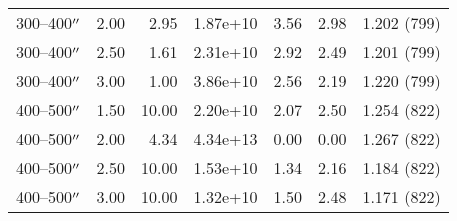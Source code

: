\documentclass[preprint2,tighten,trackchanges]{aastex6}
\begin{document}
\begin{table*}
\begin{tabular}{@{}lrrrrrr@{}}
        300--400$\mbox{$^{\prime\prime}$}$ & 2.00 & 2.95 & 1.87e+10 & 3.56 & 2.98 & 1.202 (799) \\  %
        300--400$\mbox{$^{\prime\prime}$}$ & 2.50 & 1.61 & 2.31e+10 & 2.92 & 2.49 & 1.201 (799) \\  %
        300--400$\mbox{$^{\prime\prime}$}$ & 3.00 & 1.00 & 3.86e+10 & 2.56 & 2.19 & 1.220 (799) \\  %
        \midrule
        400--500$\mbox{$^{\prime\prime}$}$ & 1.50 & 10.00 & 2.20e+10 & 2.07 & 2.50 & 1.254 (822) \\  %
        400--500$\mbox{$^{\prime\prime}$}$ & 2.00 &  4.34 & 4.34e+13 & 0.00 & 0.00 & 1.267 (822) \\  %
        400--500$\mbox{$^{\prime\prime}$}$ & 2.50 & 10.00 & 1.53e+10 & 1.34 & 2.16 & 1.184 (822) \\  %
        400--500$\mbox{$^{\prime\prime}$}$ & 3.00 & 10.00 & 1.32e+10 & 1.50 & 2.48 & 1.171 (822) \\  %
        \bottomrule
    \end{tabular}
\end{table*}
\end{document}
